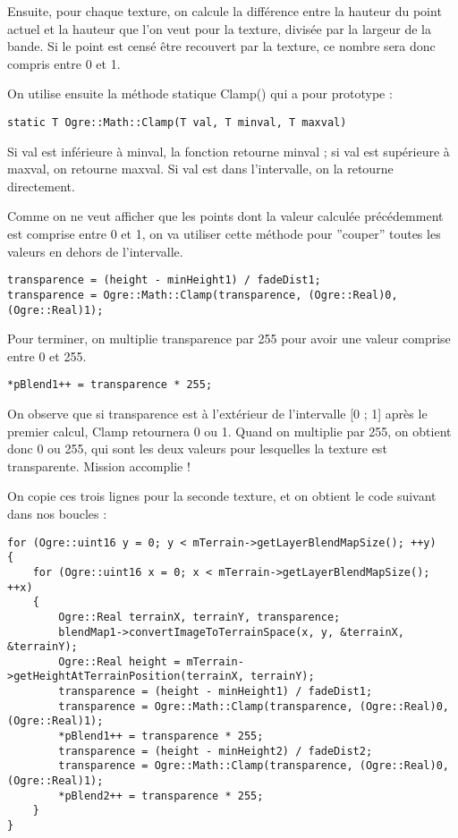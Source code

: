 Ensuite, pour chaque texture, on calcule la diff\'erence entre la hauteur du point actuel et la hauteur que l'on veut pour la texture, divis\'ee par la largeur de la bande. Si le point est cens\'e \^etre recouvert par la texture, ce nombre sera donc compris entre 0 et 1.

On utilise ensuite la m\'ethode statique Clamp() qui a pour prototype :

\begin{lstlisting}[caption={Utilisation de la m\'ethode statique Clamp()}]
static T Ogre::Math::Clamp(T val, T minval, T maxval)
\end{lstlisting}

Si val est inf\'erieure \`a minval, la fonction retourne minval ; si val est sup\'erieure \`a maxval, on retourne maxval. Si val est dans l'intervalle, on la retourne directement.

Comme on ne veut afficher que les points dont la valeur calcul\'ee pr\'ec\'edemment est comprise entre 0 et 1, on va utiliser cette m\'ethode pour ''couper'' toutes les valeurs en dehors de l'intervalle.

\begin{lstlisting}[caption={}]
transparence = (height - minHeight1) / fadeDist1;
transparence = Ogre::Math::Clamp(transparence, (Ogre::Real)0, (Ogre::Real)1);
\end{lstlisting}

Pour terminer, on multiplie transparence par 255 pour avoir une valeur comprise entre 0 et 255.

\begin{lstlisting}[caption={}]
*pBlend1++ = transparence * 255;
\end{lstlisting}

On observe que si transparence est \`a l'ext\'erieur de l'intervalle [0 ; 1] apr\`es le premier calcul, Clamp retournera 0 ou 1. Quand on multiplie par 255, on obtient donc 0 ou 255, qui sont les deux valeurs pour lesquelles la texture est transparente. Mission accomplie !

On copie ces trois lignes pour la seconde texture, et on obtient le code suivant dans nos boucles :

\begin{lstlisting}[caption={}]
for (Ogre::uint16 y = 0; y < mTerrain->getLayerBlendMapSize(); ++y)
{
    for (Ogre::uint16 x = 0; x < mTerrain->getLayerBlendMapSize(); ++x)
    {
        Ogre::Real terrainX, terrainY, transparence;
        blendMap1->convertImageToTerrainSpace(x, y, &terrainX, &terrainY);
        Ogre::Real height = mTerrain->getHeightAtTerrainPosition(terrainX, terrainY);
        transparence = (height - minHeight1) / fadeDist1;
        transparence = Ogre::Math::Clamp(transparence, (Ogre::Real)0, (Ogre::Real)1);
        *pBlend1++ = transparence * 255;
        transparence = (height - minHeight2) / fadeDist2;
        transparence = Ogre::Math::Clamp(transparence, (Ogre::Real)0, (Ogre::Real)1);
        *pBlend2++ = transparence * 255;
    }
}
\end{lstlisting}

